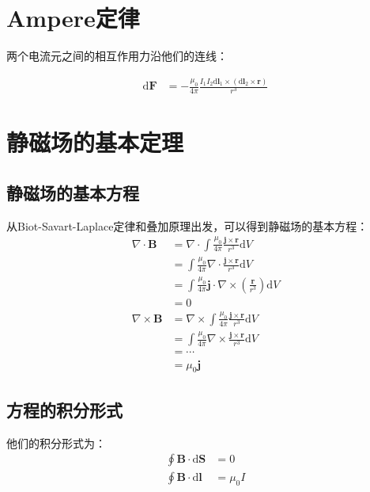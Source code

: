 \documentclass[12pt,onecolumn,a4paper]{book}
\numberwithin{table}{subsection}
\numberwithin{equation}{subsection}
\begin{document}
\section{Ampere定律}

两个电流元之间的相互作用力沿他们的连线：

\begin{align}
    \mathrm{d} \mathbf{F} & = -\frac{\mu_0}{4\pi} \frac{I_1 I_2 \mathrm{d} \mathbf{l}_1 \times (\mathrm{d} \mathbf{l}_2 \times \mathbf{r})}{r^3}
\end{align}

\section{静磁场的基本定理}

\subsection{静磁场的基本方程}

从Biot-Savart-Laplace定律和叠加原理出发，可以得到静磁场的基本方程：
\begin{align}
    \nabla \cdot \mathbf{B}  & = \nabla \cdot \int \frac{\mu_0}{4\pi} \frac{  \mathbf{j} \times \mathbf{r}}{r^3} \mathrm{d} V   \\
                             & = \int \frac{\mu_0}{4\pi} \nabla \cdot \frac{  \mathbf{j} \times \mathbf{r}}{r^3} \mathrm{d} V   \\
                             & = \int \frac{\mu_0}{4\pi} \mathbf{j} \cdot  \nabla  \times(\frac{ \mathbf{r}}{r^3}) \mathrm{d} V \\
                             & = 0                                                                                              \\
    \nabla \times \mathbf{B} & = \nabla \times \int \frac{\mu_0}{4\pi} \frac{  \mathbf{j} \times \mathbf{r}}{r^3} \mathrm{d} V  \\
                             & = \int \frac{\mu_0}{4\pi} \nabla \times \frac{  \mathbf{j} \times \mathbf{r}}{r^3} \mathrm{d} V  \\
                             & = \cdots                                                                                         \\
                             & = \mu_0 \mathbf{j}
\end{align}

\subsection{方程的积分形式}
他们的积分形式为：
\begin{align}
    \oint \mathbf{B} \cdot \mathrm{d} \mathbf{S} & = 0       \\
    \oint \mathbf{B} \cdot \mathrm{d} \mathbf{l} & = \mu_0 I
\end{align}
\end{document}

